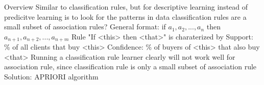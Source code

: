 \begin{outline}
    \1 Overview
        \2 Similar to classification rules, but for descriptive learning instead of predicitve learning
        \2 is to look for the patterns in data
        \2 classification rules are a small subset of association rules?
    \1 General format: if $a_{1}, a_{2}, ..., a_{n}$ then $a_{n+1}, a_{n+2}, ..., a_{n+m}$
    \1 Rule "If <this> then <that>" is charaterized by
        \2 Support: \% of all clients that buy <this>
        \2 Confidence: \% of buyers of <this> that also buy <that>
    \1 Running a classification rule learner clearly will not work well for association rule, since classification rule is only a small subset of association rule
        \2 Solution: APRIORI algorithm
\end{outline}
\pagebreak